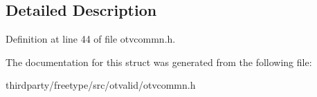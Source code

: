 \subsection{Detailed Description}


Definition at line 44 of file otvcommn.\+h.



The documentation for this struct was generated from the following file\+:\begin{DoxyCompactItemize}
\item 
thirdparty/freetype/src/otvalid/otvcommn.\+h\end{DoxyCompactItemize}
